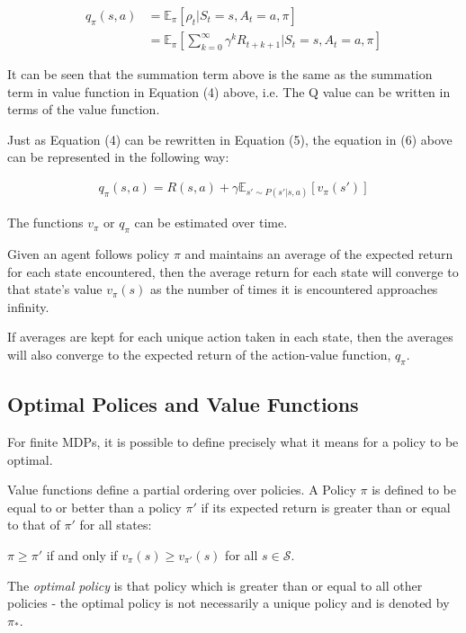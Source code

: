 \documentclass{article}
\begin{document}
\begin{align}
    q_\pi(s, a) &= \mathbb{E}_\pi [\rho_t | S_t = s, A_t = a, \pi]  \nonumber\\
                &= \mathbb{E}_\pi \left[\sum_{k=0}^{\infty} \gamma ^k R_{t+k+1}| S_t = s, A_t = a, \pi\right]
\end{align}

It can be seen that the summation term above is the same as the summation term in value function in Equation (4) above, i.e. The Q value can be written in terms of the value function. 

Just as Equation (4) can be rewritten in Equation (5), the equation in (6) above can be represented in the following way\cite{UCBSlides}: 

\begin{align}
    q_\pi(s,a) = R(s,a) + \gamma \mathbb{E}_{s' \sim P(s'|s, a)} \left[ v_\pi(s')\right]
\end{align}

The functions $v_\pi$ or $q_\pi$ can be estimated over time. 

Given an agent follows policy $\pi$ and maintains an average of the expected return for each state encountered, then the average return for each state will converge to that state's value $v_\pi(s)$ as the number of times it is encountered approaches infinity.

If averages are kept for each unique action taken in each state, then the averages will also converge to the expected return of the action-value function, $q_\pi$\cite{Sutton1998}.

\subsection{Optimal Polices and Value Functions}

For finite MDPs, it is possible to define precisely what it means for a policy to be optimal\cite{Sutton1998}. 

Value functions define a partial ordering over policies. A Policy $\pi$ is defined to be equal to or better than a policy $\pi'$ if its expected return is greater than or equal to that of $\pi'$ for all states:

$\pi \geq \pi'$ if and only if $v_\pi(s) \geq v_{\pi'}(s)$ for all $s \in \mathcal{S}$.

The \textit{optimal policy} is that policy which is greater than or equal to all other policies - the optimal policy is not necessarily a unique policy and is denoted by $\pi_*$. 
\end{document}
